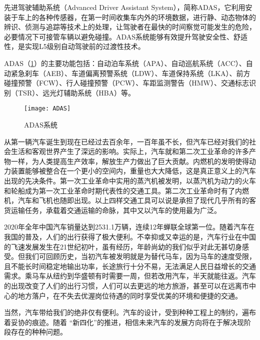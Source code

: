 \documentclass[UTF8]{ctexart}
\numberwithin{figure}{section}
\numberwithin{table}{section}
\begin{document}
先进驾驶辅助系统（Advanced Driver Assistant System），简称ADAS，它利用安装于车上的各种传感器，在第一时间收集车内外的环境数据，进行静、动态物体的辨识、侦测与追踪等技术上的处理，让驾驶者在最快的时间察觉可能发生的危险，必要情况下可接管车辆以避免碰撞。ADAS系统能够有效提升驾驶安全性、舒适性，是实现L5级别自动驾驶前的过渡性技术。

ADAS（\cref{ADAS}）的主要功能包括：自动泊车系统（APA）、自动巡航系统（ACC）、自动紧急刹车（AEB）、车道偏离预警系统（LDW）、车道保持系统（LKA）、前方碰撞预警（FCW）、行人碰撞预警（PCW）、车距监测警告（HMW）、交通标志识别（TSR）、远光灯辅助系统（HBA）等。

\begin{figure}[htbp]
	\centering
	\begin{minipage}[b]{\textwidth}
		\centering
		\texttt{[image: ADAS]}
		\caption{ADAS系统}
		\label{ADAS}
	\end{minipage}
\end{figure}

从第一辆汽车诞生到现在已经过去百余年，一百年虽不长，但汽车已经对我们的社会生活和客观世界产生了深远的影响。实际上，汽车就和第二次工业革命的许多产物一样，为人类提高生产效率，解放生产力做出了巨大贡献。内燃机的发明使得动力装置能够被整合在一个更小的空间内，重量也大大降低，这是真正意义上的汽车出现的先决条件。第一次工业革命中实用的蒸汽机被发明，以蒸汽机为动力的火车和轮船成为第一次工业革命时期代表性的交通工具。第二次工业革命时有了内燃机，汽车和飞机也随即出现。以上四样交通工具可以说是承担了现代几乎所有的客货运输任务，承载着交通运输的命脉，其中又以汽车的使用最为广泛。

2020年全年中国汽车销量达到2531.1万辆，连续12年蝉联全球第一位。随着汽车在我国的普及，人们的出行获得了极大便利。不幸抑或又幸运的是，汽车行业在中国的飞速发展发生在21世纪初叶，虽有经历，年龄尚幼的我们似乎对此无甚切身感受。但我们可回顾历史，当初汽车被发明就是为替代马车，因为马车的速度受限，且不能长时间稳定地输出功率，长途旅行十分不易，无法满足人民日益增长的交通需求。乘马车从纽约到华盛顿有时需要一周，但若改用汽车，半天就能往返。汽车的出现改变了人们的出行习惯，人们可以去更远的地方旅游，甚至可以在远离市中心的地方落户，在不失去优渥岗位待遇的同时享受优美的环境和便捷的交通。

当然，汽车带给我们的绝非仅有便利。汽车的设计，受到种种工程上的制约，遍布着妥协的痕迹。随着 “新四化”的推进，相信未来汽车的发展方向将在于解决现阶段存在的种种问题。
\end{document}
